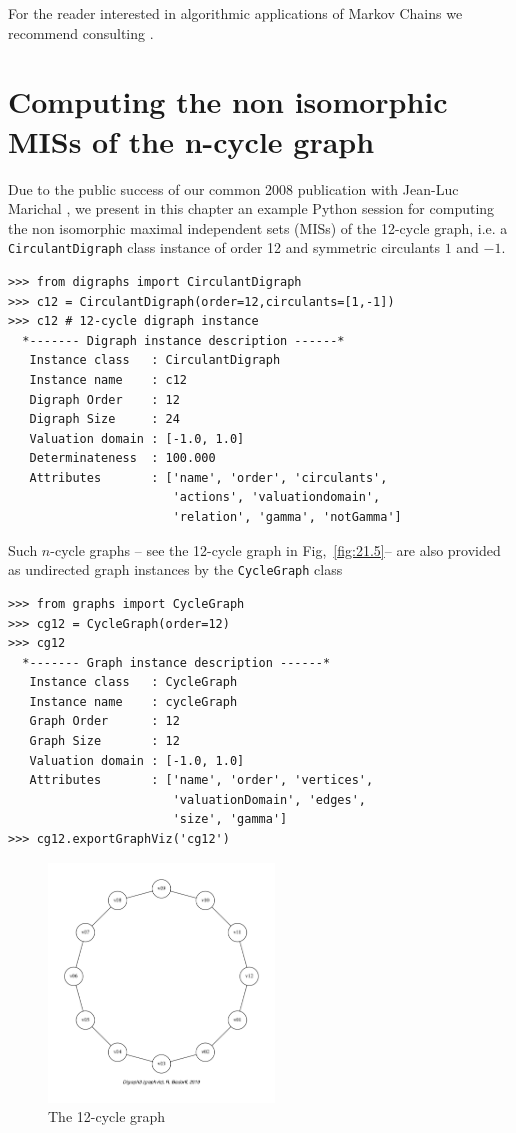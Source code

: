 For the reader interested in algorithmic applications of Markov Chains we recommend consulting \citet{HAG-2002}.

\section{Computing the non isomorphic MISs of the n-cycle graph}
\label{sec:21.7}

Due to the public success of our common 2008 publication with Jean-Luc Marichal \citep{ISOMIS-08} , we present in this chapter an example Python session for computing the non isomorphic maximal independent sets (MISs) of the 12-cycle graph, i.e. a \texttt{CirculantDigraph} class instance of order 12 and symmetric circulants $1$ and $-1$.
\begin{lstlisting}
>>> from digraphs import CirculantDigraph
>>> c12 = CirculantDigraph(order=12,circulants=[1,-1])
>>> c12 # 12-cycle digraph instance
  *------- Digraph instance description ------*
   Instance class   : CirculantDigraph
   Instance name    : c12
   Digraph Order    : 12
   Digraph Size     : 24
   Valuation domain : [-1.0, 1.0]
   Determinateness  : 100.000
   Attributes       : ['name', 'order', 'circulants',
                       'actions', 'valuationdomain',
                       'relation', 'gamma', 'notGamma']
\end{lstlisting}

Such $n$-cycle graphs -- see the 12-cycle graph in Fig,~\vref{fig:21.5}-- are also provided as undirected graph instances by the \texttt{CycleGraph} class 
\begin{lstlisting}
>>> from graphs import CycleGraph
>>> cg12 = CycleGraph(order=12)
>>> cg12
  *------- Graph instance description ------*
   Instance class   : CycleGraph
   Instance name    : cycleGraph
   Graph Order      : 12
   Graph Size       : 12
   Valuation domain : [-1.0, 1.0]
   Attributes       : ['name', 'order', 'vertices',
                       'valuationDomain', 'edges',
                       'size', 'gamma']
>>> cg12.exportGraphViz('cg12')
\end{lstlisting}
\begin{figure}[h]
\sidecaption[t]
\includegraphics[width=6cm]{Figures/21-5-cg12.pdf}
\caption{The 12-cycle graph} 
\label{fig:21.5}       %
\end{figure}

